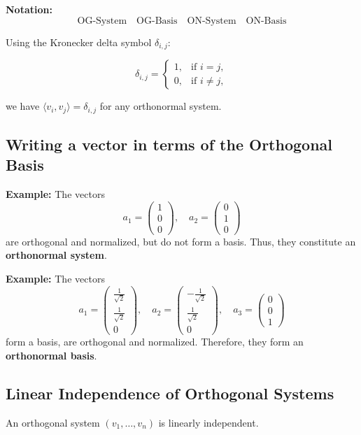\textbf{Notation:}
\[
\text{OG-System} \quad \text{OG-Basis} \quad \text{ON-System} \quad \text{ON-Basis}
\]

Using the Kronecker delta symbol \( \delta_{i,j} \):

\[
\delta_{i,j} =
\begin{cases}
1, & \text{if } i = j, \\
0, & \text{if } i \neq j,
\end{cases}
\]

we have \( \langle v_i, v_j \rangle = \delta_{i,j} \) for any orthonormal system.

\subsection{Writing a vector in terms of the Orthogonal Basis}
\textbf{Example:} The vectors
\[
a_1 =
\begin{pmatrix}
1 \\
0 \\
0
\end{pmatrix}, \quad
a_2 =
\begin{pmatrix}
0 \\
1 \\
0
\end{pmatrix}
\]
are orthogonal and normalized, but do not form a basis. Thus, they constitute an \textbf{orthonormal system}.

\textbf{Example:} The vectors
\[
a_1 =
\begin{pmatrix}
\frac{1}{\sqrt{2}} \\
\frac{1}{\sqrt{2}} \\
0
\end{pmatrix}, \quad
a_2 =
\begin{pmatrix}
-\frac{1}{\sqrt{2}} \\
\frac{1}{\sqrt{2}} \\
0
\end{pmatrix}, \quad
a_3 =
\begin{pmatrix}
0 \\
0 \\
1
\end{pmatrix}
\]
form a basis, are orthogonal and normalized. Therefore, they form an \textbf{orthonormal basis}.

\subsection{Linear Independence of Orthogonal Systems}
An orthogonal system \( (v_1, \ldots, v_n) \) is linearly independent.


